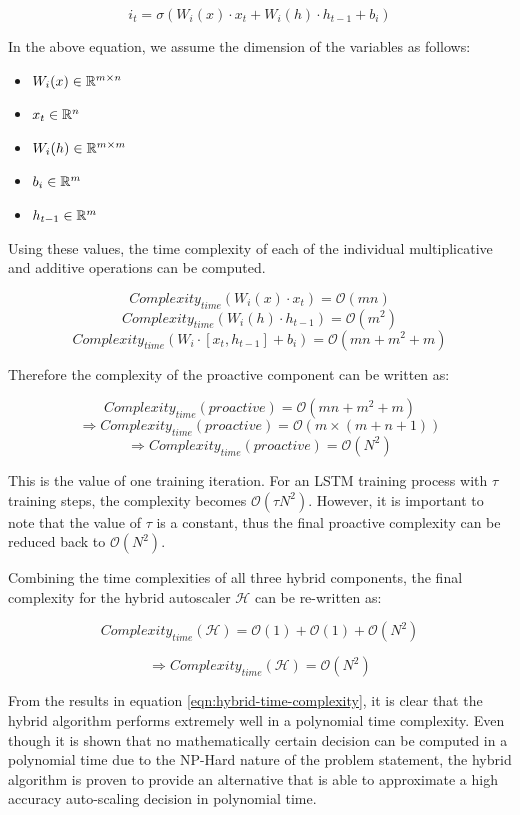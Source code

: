 \begin{equation}
    i_{t} = \sigma(W_{i}(x) \cdot x_{t} + W_{i}(h) \cdot h_{t-1} + b_{i})
\end{equation}

In the above equation, we assume the dimension of the variables as follows:

\begin{itemize}
    \item $W_{i}(x) \in \mathbb{R}^{m \times n}$
    \item $x_{t} \in \mathbb{R}^{n}$
    \item $W_{i}(h) \in \mathbb{R}^{m \times m}$
    \item $b_{i} \in \mathbb{R}^{m}$
    \item $h_{t-1} \in \mathbb{R}^{m}$
\end{itemize}

Using these values, the time complexity of each of the individual multiplicative and additive operations can be computed.

\[Complexity_{time}(W_{i}(x) \cdot x_{t}) = \mathcal{O}(mn)\]
\[Complexity_{time}(W_{i}(h) \cdot h_{t-1}) = \mathcal{O}(m^2)\]
\begin{equation}
    Complexity_{time}(W_{i} \cdot [x_{t}, h_{t-1}] + b_{i}) = \mathcal{O}(mn + m^2 + m)
\end{equation}

Therefore the complexity of the proactive component can be written as:

\[Complexity_{time}(proactive) = \mathcal{O}(mn + m^2 + m)\]
\[\Rightarrow Complexity_{time}(proactive) = \mathcal{O}(m \times (m + n + 1))\]
\begin{equation}
    \Rightarrow Complexity_{time}(proactive) = \mathcal{O}(N^2)
\end{equation}

This is the value of one training iteration. For an LSTM training process with $\tau$ training steps, the complexity becomes $\mathcal{O}(\tau N^2)$. However, it is important to note that the value of $\tau$ is a constant, thus the final proactive complexity can be reduced back to $\mathcal{O}(N^2)$.\par

Combining the time complexities of all three hybrid components, the final complexity for the hybrid autoscaler $\mathcal{H}$ can be re-written as:

\[Complexity_{time}(\mathcal{H}) = \mathcal{O}(1) +  \mathcal{O}(1) + \mathcal{O}(N^2)\]

\begin{equation}
    \label{eqn:hybrid-time-complexity}
    \Rightarrow Complexity_{time}(\mathcal{H}) = \mathcal{O}(N^2)
\end{equation}

From the results in equation \ref{eqn:hybrid-time-complexity}, it is clear that the hybrid algorithm performs extremely well in a polynomial time complexity. Even though it is shown that no mathematically certain decision can be computed in a polynomial time due to the NP-Hard nature of the problem statement, the hybrid algorithm is proven to provide an alternative that is able to approximate a high accuracy auto-scaling decision in polynomial time.